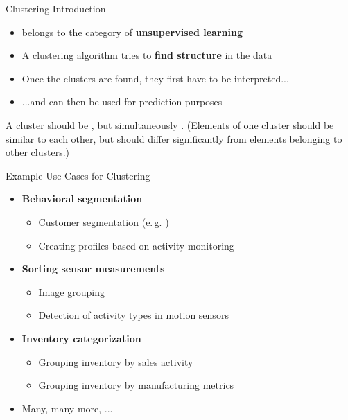 \begin{frame}{Clustering Introduction}{}
	\begin{itemize}
		\item {} belongs to the category of \textbf{unsupervised learning}
		\item A clustering algorithm tries to \textbf{find structure} in the data
		\item Once the clusters are found, they first have to be interpreted...
		\item ...and can then be used for prediction purposes
	\end{itemize}
	
	\vspace*{3mm}
	\begin{boxBlueNoFrame}
		\footnotesize
		A cluster should be , but simultaneously .
		(Elements of one cluster should be similar to each other, but should differ significantly from elements belonging to other clusters.)
	\end{boxBlueNoFrame}
\end{frame}


\begin{frame}{Example Use Cases for Clustering}{}
	\begin{itemize}
		\item \textbf{Behavioral segmentation}
		\begin{itemize}
			\item Customer segmentation (e.\,g. )
			\item Creating profiles based on activity monitoring
		\end{itemize}
		\item \textbf{Sorting sensor measurements}
		\begin{itemize}
			\item Image grouping
			\item Detection of activity types in motion sensors
		\end{itemize}
		\item \textbf{Inventory categorization}
		\begin{itemize}
			\item Grouping inventory by sales activity
			\item Grouping inventory by manufacturing metrics
		\end{itemize}
		\item Many, many more, ...
	\end{itemize}
\end{frame}


